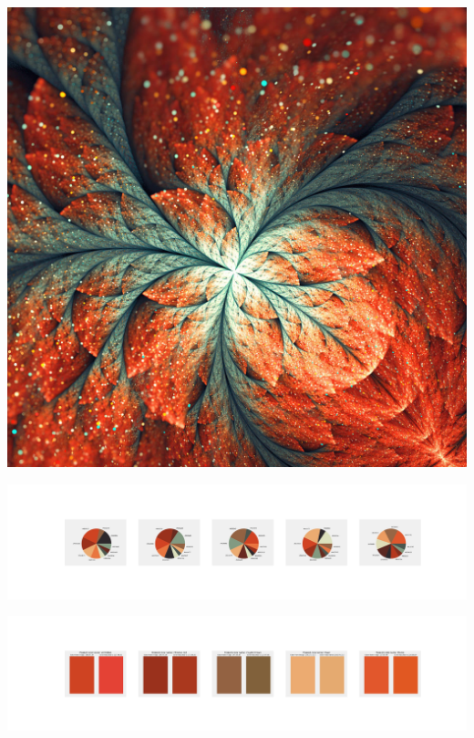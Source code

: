 \documentclass[11pt]{article}
\begin{document}
\begin{landscape}
    \begin{center}
    \includegraphics[width=\textwidth]{./nbimg/file (443).jpg}
    \end{center}

    \begin{center}
    \includegraphics[width=250mm]{./nbimg/pie-382.jpg}
    \end{center}

    \begin{center}
    \includegraphics[width=250mm]{./nbimg/peak-382.jpg}
    \end{center}
    


\end{landscape}
\end{document}
